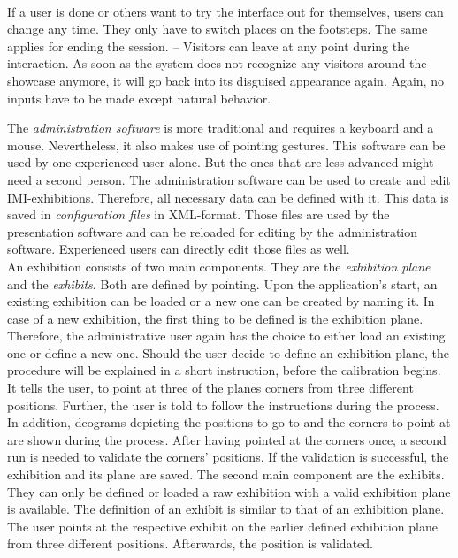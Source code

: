 \\
If a user is done or others want to try the interface out for themselves, users can change any time. They only have to switch places on the footsteps. The same applies for ending the session. -- Visitors can leave at any point during the interaction. As soon as the system does not recognize any visitors around the showcase anymore, it will go back into its disguised appearance again. Again, no inputs have to be made except natural behavior.

The \textit{administration software} is more traditional and requires a keyboard and a mouse. Nevertheless, it also makes use of pointing gestures. This software can be used by one experienced user alone. But the ones that are less advanced might need a second person. The administration software can be used to create and edit \ac{IMI}-exhibitions. Therefore, all necessary data can be defined with it. This data is saved in \textit{configuration files} in XML-format. Those files are used by the presentation software and can be reloaded for editing by the administration software. Experienced users can directly edit those files as well. 
\\
An exhibition consists of two main components. They are the \textit{exhibition plane} and the \textit{exhibits}. Both are defined by pointing. Upon the application's start, an existing exhibition can be loaded or a new one can be created by naming it. In case of a new exhibition, the first thing to be defined is the exhibition plane. Therefore, the administrative user again has the choice to either load an existing one or define a new one. Should the user decide to define an exhibition plane, the procedure will be explained in a short instruction, before the calibration begins. It tells the user, to point at three of the planes corners from three different positions. Further, the user is told to follow the instructions during the process. In addition, deograms depicting the positions to go to and the corners to point at are shown during the process. After having pointed at the corners once, a second run is needed to validate the corners' positions. If the validation is successful, the exhibition and its plane are saved. The second main component are the exhibits. They can only be defined or loaded a raw exhibition with a valid exhibition plane is available. The definition of an exhibit is similar to that of an exhibition plane. The user points at the respective exhibit on the earlier defined exhibition plane from three different positions. Afterwards, the position is validated.
